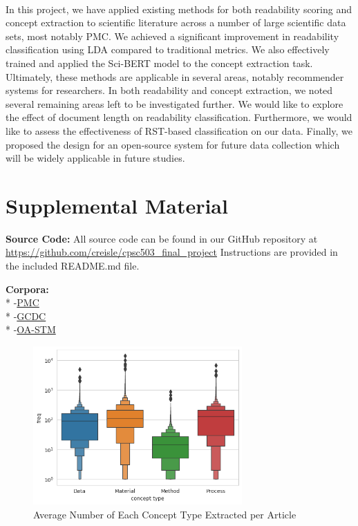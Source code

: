 \documentclass[11pt,a4paper]{article}
\begin{document}
\paragraph{}
In this project, we have applied existing methods for both readability scoring and concept extraction to scientific literature across a number of large scientific data sets, most notably PMC. We achieved a significant improvement in readability classification using LDA compared to traditional metrics. We also effectively trained and applied the Sci-BERT model to the concept extraction task. Ultimately, these methods are applicable in several areas, notably recommender systems for researchers. 
In both readability and concept extraction, we noted several remaining areas left to be investigated further. We would like to  explore the effect of document length on readability classification. Furthermore, we would like to assess the effectiveness of RST-based classification on our data. Finally, we proposed the design for an open-source system for future data collection which will be widely applicable in future studies.






\clearpage



\section{Supplemental Material}
\label{sec:supplemental}
\textbf{Source Code:} All source code can be found in our GitHub repository at \url{https://github.com/creisle/cpsc503_final_project} 
Instructions are provided in the included README.md file. \newline


\noindent\textbf{Corpora:}\\* 
	-\href{https://www.ncbi.nlm.nih.gov/pmc/tools/openftlist/}{PMC}\\*
	-\href{https://github.com/aylai/GCDC-corpus}{GCDC}\\*
	-\href{https://github.com/elsevierlabs/OA-STM-Corpus}{OA-STM}\newline


\begin{figure}[ht]
    \centering
    \includegraphics[width=8cm]{images/pmc.concepts.type_per_article.png}
    \caption{Average Number of Each Concept Type Extracted per Article}
    \label{fig:scibert-concept-types-per-article}
\end{figure}
\end{document}
